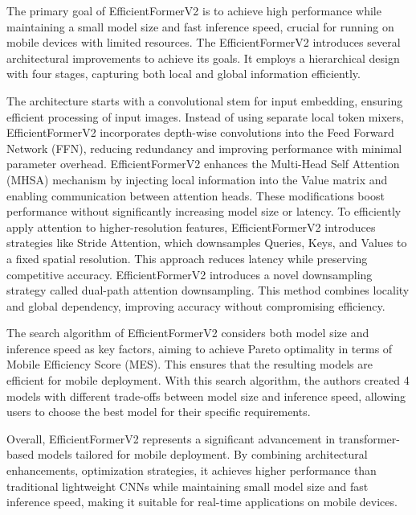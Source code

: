 \documentclass[a4paper,oneside]{article}
\begin{document}
The primary goal of EfficientFormerV2 is to achieve high performance while maintaining a small model size and fast inference speed, crucial for running on mobile devices with limited resources.
The EfficientFormerV2 introduces several architectural improvements to achieve its goals.
It employs a hierarchical design with four stages, capturing both local and global information efficiently.

The architecture starts with a convolutional stem for input embedding, ensuring efficient processing of input images.
Instead of using separate local token mixers, EfficientFormerV2 incorporates depth-wise convolutions into the Feed Forward Network (FFN), reducing redundancy and improving performance with minimal parameter overhead.
EfficientFormerV2 enhances the Multi-Head Self Attention (MHSA) mechanism by injecting local information into the Value matrix and enabling communication between attention heads.
These modifications boost performance without significantly increasing model size or latency.
To efficiently apply attention to higher-resolution features, EfficientFormerV2 introduces strategies like Stride Attention, which downsamples Queries, Keys, and Values to a fixed spatial resolution.
This approach reduces latency while preserving competitive accuracy.
EfficientFormerV2 introduces a novel downsampling strategy called dual-path attention downsampling.
This method combines locality and global dependency, improving accuracy without compromising efficiency.

The search algorithm of EfficientFormerV2 considers both model size and inference speed as key factors, aiming to achieve Pareto optimality in terms of Mobile Efficiency Score (MES).
This ensures that the resulting models are efficient for mobile deployment.
With this search algorithm, the authors created 4 models with different trade-offs between model size and inference speed, allowing users to choose the best model for their specific requirements.

Overall, EfficientFormerV2 represents a significant advancement in transformer-based models tailored for mobile deployment.
By combining architectural enhancements, optimization strategies, it achieves higher performance than traditional lightweight CNNs while maintaining small model size and fast inference speed, making it suitable for real-time applications on mobile devices.
\end{document}
